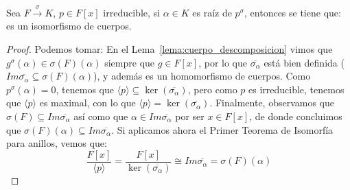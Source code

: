 \begin{lema}\label{lema:extension}
    Sea $F\stackrel{\sigma}{\to}{K}$, $p\in F[x]$ irreducible, si $\alpha\in K$ es raíz de $p^\sigma$, entonces se tiene que:
    es un isomorfismo de cuerpos.
    \begin{proof}
        Podemos tomar:
        En el Lema~\ref{lema:cuerpo_descomposicion} vimos que $g^{\sigma}(\alpha)\in \sigma(F)(\alpha)$ siempre que $g\in F[x]$, por lo que $\overline{\sigma_\alpha}$ está bien definida ($Im \overline{\sigma_\alpha}\subseteq  \sigma(F)(\alpha)$), y además es un homomorfismo de cuerpos. Como $p^\sigma(\alpha)=0$, tenemos que $\langle p \rangle \subseteq \ker(\overline{\sigma_\alpha})$, pero como $p$ es irreducible, tenemos que $\langle p \rangle $ es maximal, con lo que $\langle p \rangle =\ker(\overline{\sigma_\alpha})$. Finalmente, observamos que $\sigma(F)\subseteq Im\overline{\sigma_\alpha}$ así como que $\alpha\in Im\overline{\sigma_\alpha}$ por ser $x\in F[x]$, de donde concluimos que $\sigma(F)(\alpha)\subseteq Im\overline{\sigma_\alpha}$. Si aplicamos ahora el Primer Teorema de Isomorfía para anillos, vemos que:
        \begin{equation*}
            \dfrac{F[x]}{\langle p \rangle } = \dfrac{F[x]}{\ker(\overline{\sigma_\alpha})} \cong Im \overline{\sigma_\alpha} = \sigma(F)(\alpha)
        \end{equation*}
    \end{proof}
\end{lema}

